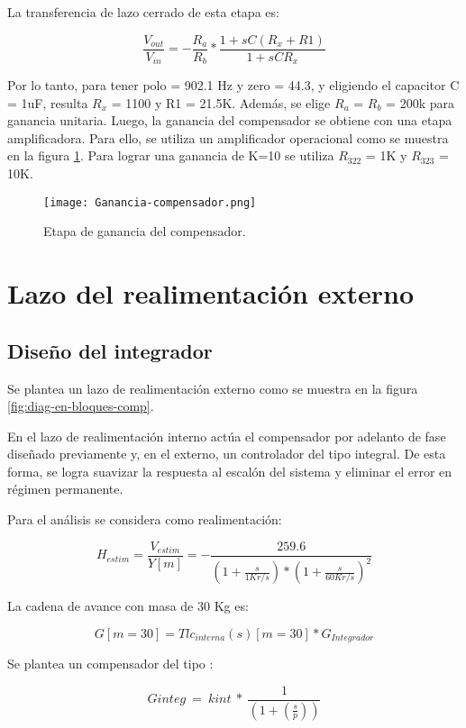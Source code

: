 \noindent La transferencia de lazo cerrado de esta etapa es:

\begin{equation} 
	\frac{V_{out}}{V_{in}}= - \frac{R_a}{R_b}*\frac{1+sC(R_x+R1)}{1+sCR_x}
\end{equation}

\noindent Por lo tanto, para tener polo = 902.1 Hz y zero = 44.3, y eligiendo el capacitor C = 1uF, resulta $R_x$ = 1100 y R1 = 21.5K. Además, se elige $R_a$ = $R_b$ = 200k para ganancia unitaria. Luego, la ganancia del compensador se obtiene con una etapa amplificadora.
Para ello, se utiliza un amplificador operacional como se muestra en la figura \ref{fig:ganancia-compensador}. Para lograr una ganancia de K=10 se utiliza $R_{322}$ = 1K y $R_{323}$ = 10K.


\begin{figure}[H]
	\centering
	\texttt{[image: Ganancia-compensador.png]}
	\caption{Etapa de ganancia del compensador.}
	\label{fig:ganancia-compensador}
\end{figure}

\section{Lazo del realimentación externo}
\subsection{Diseño del integrador}

\noindent Se plantea un lazo de realimentaci\'{o}n externo como se muestra en la  figura \ref{fig:diag-en-bloques-comp}.

\noindent En el lazo de realimentaci\'{o}n interno act\'{u}a el compensador por adelanto de fase dise\~{n}ado previamente y, en el externo, un controlador del tipo integral. De esta forma, se logra suavizar la respuesta al escal\'{o}n del sistema y eliminar el error en r\'{e}gimen permanente.


\noindent Para el an\'{a}lisis se considera como realimentaci\'{o}n: 

\[H_{estim}=\frac{V_{estim}}{Y[m]}= - \frac{259.6}{(1 + \frac{s}{1Kr/s})*(1+\frac{s}{60Kr/s})^2}\] 

\noindent La cadena de avance con masa de 30 Kg es:

\[G[m=30]=Tlc_{interna}(s)[m=30]*G_{Integrador}\] 

\noindent Se  plantea un compensador del tipo :

\[Ginteg\ =\ kint\ *\ \frac{1}{(1+(\frac{s}{p}))}\]

